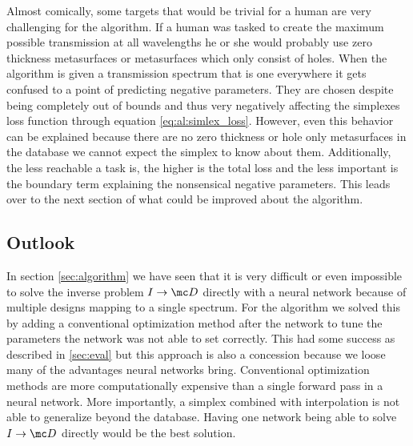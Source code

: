 \indent
Almost comically, some targets that would be trivial for a human are very challenging for the algorithm. If a human was tasked to create the maximum possible transmission at all wavelengths he or she would probably use zero thickness metasurfaces or metasurfaces which only consist of holes. When the algorithm is given a transmission spectrum that is one everywhere it gets confused to a point of predicting negative parameters.
They are chosen despite being completely out of bounds and thus very negatively affecting the simplexes loss function through equation \eqref{eq:al:simlex_loss}.
However, even this behavior can be explained because there are no zero thickness or hole only metasurfaces in the database we cannot expect the simplex to know about them.
Additionally, the less reachable a task is, the higher is the total loss and the less important is the boundary term explaining the nonsensical negative parameters. This leads over to the next section of what could be improved about the algorithm.
\newpage

\subsection{Outlook}\label{sec:outlook}
In section \ref{sec:algorithm} we have seen that it is very difficult or even impossible to solve the inverse problem $I \rightarrow \mc D$ directly with a neural network because of multiple designs mapping to a single spectrum. For the algorithm we solved this by adding a conventional optimization method after the network to tune the parameters the network was not able to set correctly.
This had some success as described in \ref{sec:eval}  but this approach is also a concession because we loose many of the advantages neural networks bring. Conventional optimization methods are more computationally expensive than a single forward pass in a neural network.
More importantly, a simplex combined with interpolation is not able to generalize beyond the database.
Having one network being able to solve $I \rightarrow \mc D$ directly would be the best solution.
\\


